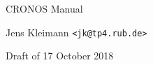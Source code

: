 \documentclass[12pt]{article}
\begin{document}
\centerline{\huge CRONOS Manual}
\vspace*{1cm}
\centerline{\large Jens Kleimann {\tt <jk@tp4.rub.de>}}
\centerline{Draft of 17 October 2018}

\tableofcontents
\newpage








\end{document}
